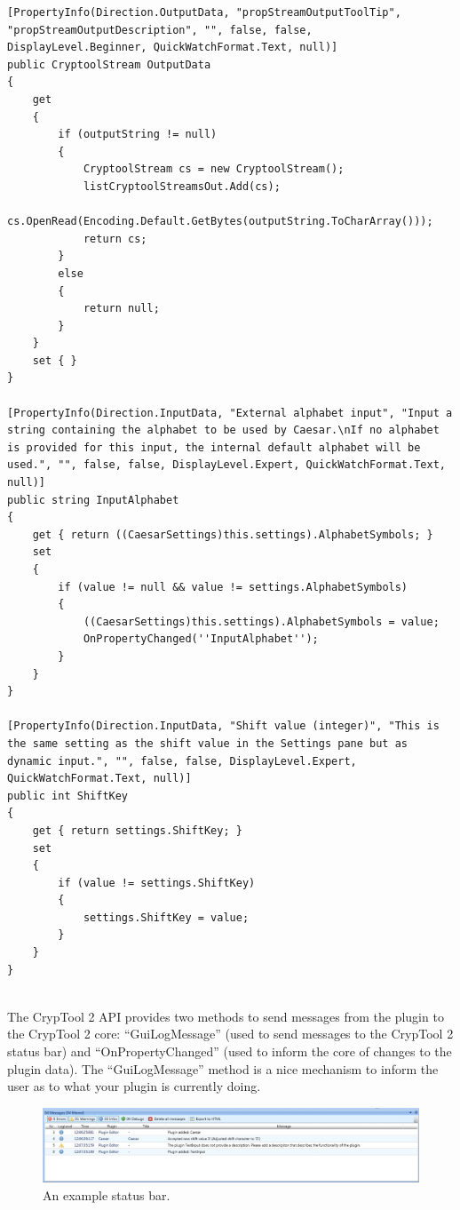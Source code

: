 \begin{lstlisting}
[PropertyInfo(Direction.OutputData, "propStreamOutputToolTip", "propStreamOutputDescription", "", false, false, DisplayLevel.Beginner, QuickWatchFormat.Text, null)]
public CryptoolStream OutputData
{
	get
	{
		if (outputString != null)
		{
			CryptoolStream cs = new CryptoolStream();
			listCryptoolStreamsOut.Add(cs);
			cs.OpenRead(Encoding.Default.GetBytes(outputString.ToCharArray()));
			return cs;
		}
		else
		{
			return null;
		}
	}
	set { }
}

[PropertyInfo(Direction.InputData, "External alphabet input", "Input a string containing the alphabet to be used by Caesar.\nIf no alphabet is provided for this input, the internal default alphabet will be used.", "", false, false, DisplayLevel.Expert, QuickWatchFormat.Text, null)]
public string InputAlphabet
{
	get { return ((CaesarSettings)this.settings).AlphabetSymbols; }
	set
	{
		if (value != null && value != settings.AlphabetSymbols)
		{
			((CaesarSettings)this.settings).AlphabetSymbols = value;
			OnPropertyChanged(''InputAlphabet'');
		}
	}
}

[PropertyInfo(Direction.InputData, "Shift value (integer)", "This is the same setting as the shift value in the Settings pane but as dynamic input.", "", false, false, DisplayLevel.Expert, QuickWatchFormat.Text, null)]
public int ShiftKey
{
	get { return settings.ShiftKey; }
	set
	{
		if (value != settings.ShiftKey)
		{
			settings.ShiftKey = value;
		}
	}
}
\end{lstlisting}

\ \\
\indent The CrypTool 2 API provides two methods to send messages from the plugin to the CrypTool 2 core: ``GuiLogMessage'' (used to send messages to the CrypTool 2 status bar) and ``OnPropertyChanged'' (used to inform the core of changes to the plugin data). The ``GuiLogMessage'' method is a nice mechanism to inform the user as to what your plugin is currently doing.

\begin{figure}[h]
	\centering
		\includegraphics[width=1.00\textwidth]{figures/status_bar.jpg}
	\caption{An example status bar.}
	\label{fig:status_bar}
\end{figure}
\clearpage

